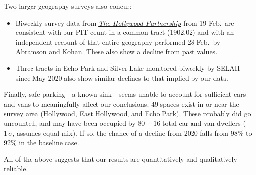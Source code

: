 \documentclass[11pt,twocolumn]{article}
\begin{document}
Two larger-geography surveys also concur:
\begin{itemize}
	\item Biweekly survey data from \href{https://hollywoodpartnership.com/}{\it The Hollywood Partnership} 
		from 19 Feb.\ are consistent with our PIT count in a common tract (1902.02) and with an independent 
		recount of that entire geography performed 28 Feb.\ by Abramson and Kohan. These also show 
		a decline from past values.
	\item Three tracts in Echo Park and Silver Lake monitored biweekly by SELAH since May 2020 
		also show similar declines to that implied by our data. 
\end{itemize}
%
%
Finally, safe parking---a known sink---seems unable to account for sufficient cars and vans
to meaningfully affect our conclusions. 49 spaces exist in or near the survey area (Hollywood,
East Hollywood, and Echo Park). These probably did go uncounted, and may have been occupied 
by $80\pm16$ total car and van dwellers ($1\,\sigma$, assumes equal mix). If so, the chance of a 
decline from 2020 falls from 98\% to 92\% in the baseline case. 

All of the above suggests that our results are quantitatively and qualitatively reliable.

%
%
%

\end{document}
